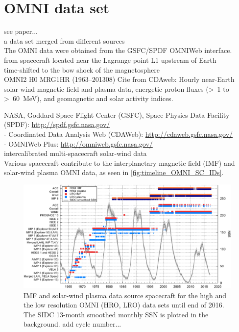 \section{OMNI data set}
\label{sec:omni_data_set}

see paper...\\

a data set merged from different sources\\
The OMNI data \citep{King2005} were obtained from the GSFC/SPDF OMNIWeb interface.\\

from spacecraft located near the Lagrange point L1 upstream of Earth\\
time-shifted to the bow shock of the magnetosphere\\

OMNI2 H0 MRG1HR (1963--201308)
Cite from CDAweb: Hourly near-Earth solar-wind magnetic field and plasma data, energetic proton fluxes (>~1 to >~60~MeV), and geomagnetic and solar activity indices.

NASA, Goddard Space Flight Center (GSFC), Space Physics Data Facility (SPDF): \url{http://spdf.gsfc.nasa.gov/}\\	%
- Coordinated Data Analysis Web (CDAWeb): \url{http://cdaweb.gsfc.nasa.gov/}\\	%
- OMNIWeb Plus: \url{http://omniweb.gsfc.nasa.gov/}\\	%

intercalibrated multi-spacecraft solar-wind data\\
Various spacecraft contribute to the interplanetary magnetic field (IMF) and solar-wind plasma OMNI data, as seen in \autoref{fig:timeline_OMNI_SC_IDs}.\\
\begin{figure}[htb]
	\centering
	\includegraphics[width=\textwidth]{images/gnuplots/timeline_OMNI_SC_IDs.pdf}
	\caption{IMF and solar-wind plasma data source spacecraft for the high and the low resolution OMNI (HRO, LRO) data sets until end of 2016. The SIDC 13-month smoothed monthly SSN is plotted in the background. add cycle number...}
	\label{fig:timeline_OMNI_SC_IDs}
\end{figure}


